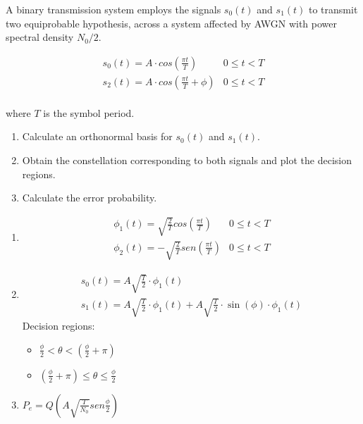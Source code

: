 \documentclass[idioma,boletin]{uah}
\begin{document}
{

	A binary transmission system employs the signals $s_0(t)$ and $s_1(t)$ to transmit two equiprobable hypothesis, across a system affected by AWGN with power spectral density $N_0/2$.

\begin{displaymath}
	\begin{array}{ll}
		s_0(t) = A \cdot cos\left ( \frac{\pi t}{T} \right ) & 0\leq t<T \\
		s_2(t) = A \cdot cos\left ( \frac{\pi t}{T} + \phi \right ) & 0\leq t<T \\
	\end{array}
\end{displaymath}

where $T$ is the symbol period.

\begin{enumerate}
	\item Calculate an orthonormal basis for $s_0(t)$ and $s_1(t)$.
	\item Obtain the constellation corresponding to both signals and plot the decision regions.
	\item Calculate the error probability.
\end{enumerate}

}
{

\begin{enumerate}
	\item \begin{displaymath}
		\begin{array}{ll}
			\phi_1(t) = \sqrt{\frac{2}{T}} cos \left ( \frac{\pi t}{T} \right ) & 0 \leq t < T \\
			\phi_2(t) = -\sqrt{\frac{2}{T}} sen \left ( \frac{\pi t}{T} \right ) & 0 \leq t < T 
		\end{array}
		\end{displaymath}
	\item \begin{displaymath}
		\begin{array}{l}
			s_0(t) = A \sqrt{\frac{T}{2}} \cdot\phi_1(t) \\
			s_1(t) = A \sqrt{\frac{T}{2}} \cdot \phi_1(t) + A \sqrt{\frac{T}{2}} \cdot \sin(\phi) \cdot \phi_1(t)
		\end{array}
		\end{displaymath}
		Decision regions: 
		\begin{itemize}
			\item 	$\frac{\phi}{2} < \theta < (\frac{\phi}{2} + \pi)$
			\item 	$(\frac{\phi}{2} + \pi) \leq \theta \leq \frac{\phi}{2}$  
		\end{itemize}
	\item $P_e = Q\left ( A \sqrt{\frac{T}{N_0}} sen \frac{\phi}{2} \right )$
\end{enumerate}

}
\end{document}
